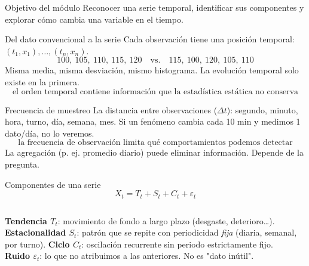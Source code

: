 



\begin{frame}{Objetivo del módulo}
Reconocer una serie temporal, identificar sus componentes y explorar cómo cambia una
variable en el tiempo.

\end{frame}

\begin{frame}{Del dato convencional a la serie}
Cada observación tiene una posición temporal: $(t_1,x_1),\dots,(t_n,x_n)$.
\[
100,\ 105,\ 110,\ 115,\ 120 \quad\text{vs.}\quad 115,\ 100,\ 120,\ 105,\ 110
\]
Misma media, misma desviación, mismo histograma. La evolución temporal solo existe en la primera.
\[
\boxed{\text{el orden temporal contiene información que la estadística estática no conserva}}
\]
\end{frame}

\begin{frame}{Frecuencia de muestreo}
La distancia entre observaciones ($\Delta t$): segundo, minuto, hora, turno, día, semana, mes.
\vfill
Si un fenómeno cambia cada 10 min y medimos 1 dato/día, no lo veremos.
\[
\boxed{\text{la frecuencia de observación limita qué comportamientos podemos detectar}}
\]
La agregación (p. ej. promedio diario) puede eliminar información. Depende de la pregunta.
\end{frame}

\begin{frame}{Componentes de una serie}
\[
\boxed{X_t = T_t + S_t + C_t + \varepsilon_t}
\]
\begin{columns}[T]
\textbf{Tendencia $T_t$}: movimiento de fondo a largo plazo (desgaste, deterioro\ldots).\\[0.6em]
\textbf{Estacionalidad $S_t$}: patrón que se repite con periodicidad \emph{fija} (diaria, semanal, por turno).
\textbf{Ciclo $C_t$}: oscilación recurrente sin periodo estrictamente fijo.\\[0.6em]
\textbf{Ruido $\varepsilon_t$}: lo que no atribuimos a las anteriores. No es "dato inútil".
\end{columns}
\end{frame}

